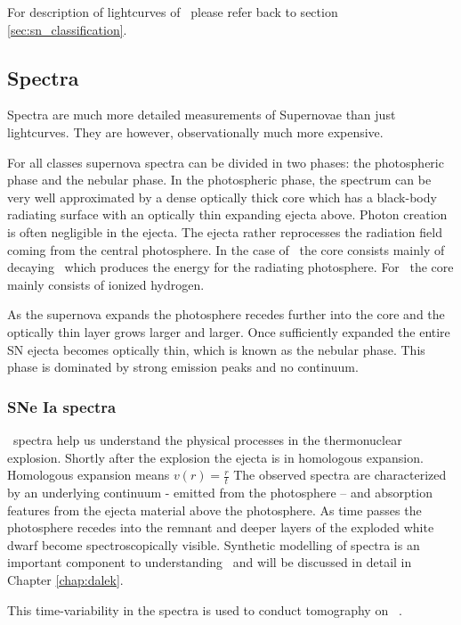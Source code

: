 For description of lightcurves of \sneii\ please refer back to section \ref{sec:sn_classification}.


\subsection{Spectra} 
\label{sec:intro_sn_spectra}
Spectra are much more detailed measurements of Supernovae than just lightcurves. They are however, observationally much more expensive. 

For all classes supernova spectra can be divided in two phases: the photospheric phase and the nebular phase.
In the photospheric phase, the spectrum can be very well approximated by a dense optically thick core which has a black-body radiating surface with an optically thin expanding ejecta above. Photon creation is often negligible in the ejecta. The ejecta rather reprocesses the radiation field coming from the central photosphere. 
In the case of \sneia\ the core consists mainly of decaying \Ni\ which produces the energy for the radiating photosphere. For \sneii\ the core mainly consists of ionized hydrogen.

As the supernova expands the photosphere recedes further into the core and the optically thin layer grows larger and larger. Once sufficiently expanded the entire SN ejecta becomes optically thin, which is known as the nebular phase. This phase is dominated by strong emission peaks and no continuum. 


\subsubsection{SNe Ia spectra}
\label{sec:intro_sneia_spectra}
\sneia\ spectra help us understand the physical processes in the thermonuclear explosion. 
Shortly after the explosion the ejecta is in homologous expansion. Homologous expansion means $v(r)=\frac{r}{t}$
The observed spectra are characterized by an underlying continuum - emitted from the photosphere -- and absorption features from the ejecta material above the photosphere. 
As time passes the photosphere recedes into the remnant and deeper layers of the exploded white dwarf become spectroscopically visible. Synthetic modelling of spectra is an important component to understanding \sneia\ and will be discussed in detail in Chapter \ref{chap:dalek}.

This time-variability in the spectra is used to conduct tomography on \sneia\ \citep{2005MNRAS.360.1231S, 2009MNRAS.399.1238H}.

